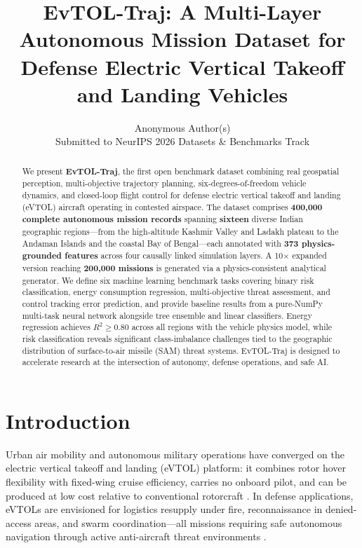 \documentclass{article}
\title{EvTOL-Traj: A Multi-Layer Autonomous Mission Dataset for\\
Defense Electric Vertical Takeoff and Landing Vehicles}
\author{%
  Anonymous Author(s)\\
  Submitted to NeurIPS 2026 Datasets \& Benchmarks Track
}
\begin{document}
\maketitle

\begin{abstract}
We present \textbf{EvTOL-Traj}, the first open benchmark dataset combining
real geospatial perception, multi-objective trajectory planning, six-degrees-of-freedom
vehicle dynamics, and closed-loop flight control for defense electric vertical
takeoff and landing (eVTOL) aircraft operating in contested airspace.
The dataset comprises \textbf{400{,}000 complete autonomous mission records}
spanning \textbf{sixteen} diverse Indian geographic regions---from the high-altitude
Kashmir Valley and Ladakh plateau to the Andaman Islands and the coastal Bay of
Bengal---each annotated with \textbf{373 physics-grounded features} across four
causally linked simulation layers.
A 10$\times$ expanded version reaching \textbf{200{,}000 missions} is
generated via a physics-consistent analytical generator.
We define six machine learning benchmark tasks covering binary risk classification,
energy consumption regression, multi-objective threat assessment, and control
tracking error prediction, and provide baseline results from a pure-NumPy
multi-task neural network alongside tree ensemble and linear classifiers.
Energy regression achieves $R^2 \geq 0.80$ across all regions with the
vehicle physics model, while risk classification reveals significant class-imbalance
challenges tied to the geographic distribution of surface-to-air missile
(SAM) threat systems. EvTOL-Traj is designed to accelerate research at the
intersection of autonomy, defense operations, and safe AI.
\end{abstract}

\section{Introduction}
\label{sec:intro}

Urban air mobility and autonomous military operations have converged on the
electric vertical takeoff and landing (eVTOL) platform: it combines rotor
hover flexibility with fixed-wing cruise efficiency, carries no onboard pilot,
and can be produced at low cost relative to conventional rotorcraft
\citep{garrow2021urban,johnson2020nasa}.
In defense applications, eVTOLs are envisioned for logistics resupply under
fire, reconnaissance in denied-access areas, and swarm coordination---all
missions requiring safe autonomous navigation through active anti-aircraft
threat environments \citep{dod2022autonomy}.
\end{document}
